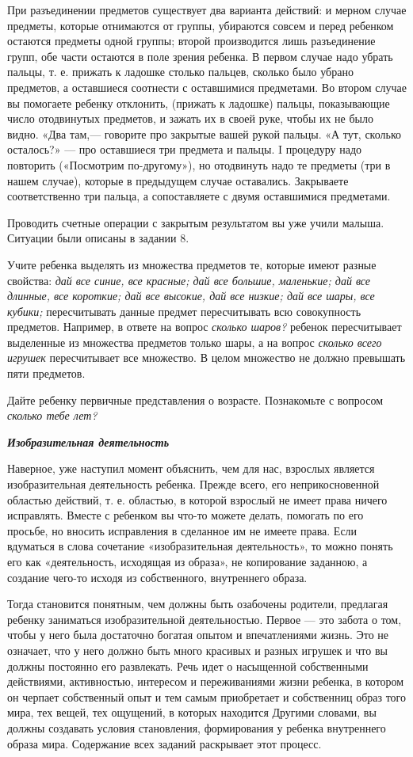 \documentclass[a5paper]{book}
\renewcommand{\emph}[1]{\textit{#1}}
\begin{document}
При разъединении предметов существует два варианта действий: и мерном
случае предметы, которые отнимаются от группы, убираются совсем и перед
ребенком остаются предметы одной группы; второй производится лишь
разъединение групп, обе части остаются в поле зрения ребенка. В первом
случае надо убрать пальцы, т. е. прижать к ладошке столько пальцев,
сколько было убрано предметов, а оставшиеся соотнести с оставшимися
предметами. Во втором случае вы помогаете ребенку отклонить, (прижать к
ладошке) пальцы, показывающие число отодвинутых предметов, и зажать их в
своей руке, чтобы их не было видно. «Два там,--- говорите про закрытые
вашей рукой пальцы. «А тут, сколько осталось?» --- про оставшиеся три
предмета и пальцы. I процедуру надо повторить («Посмотрим по-другому»),
но отодвинуть надо те предметы (три в нашем случае), которые в
предыдущем случае оставались. Закрываете соответственно три пальца, а
сопоставляете с двумя оставшимися предметами.

Проводить счетные операции с закрытым результатом вы уже учили малыша.
Ситуации были описаны в задании 8.

Учите ребенка выделять из множества предметов те, которые имеют разные
свойства: \emph{дай все синие, все красные; дай все большие, маленькие;
дай все длинные, все короткие; дай все высокие, дай все низкие; дай все
шары, все кубики;} пересчитывать данные предмет пересчитывать всю
совокупность предметов. Например, в ответе на вопрос \emph{сколько
шаров?} ребенок пересчитывает выделенные из множества предметов только
шары, а на вопрос \emph{сколько всего игрушек} пересчитывает все
множество. В целом множество не должно превышать пяти предметов.

Дайте ребенку первичные представления о возрасте. Познакомьте с вопросом
\emph{сколько тебе лет?}

\emph{\textbf{Изобразительная деятельность}}

Наверное, уже наступил момент объяснить, чем для нас, взрослых является
изобразительная деятельность ребенка. Прежде всего, его неприкосновенной
областью действий, т. е. областью, в которой взрослый не имеет права
ничего исправлять. Вместе с ребенком вы что-то можете делать, помогать
по его просьбе, но вносить исправления в сделанное им не имеете права.
Если вдуматься в слова сочетание «изобразительная деятельность», то
можно понять его как «деятельность, исходящая из образа», не копирование
заданною, а создание чего-то исходя из собственного, внутреннего образа.

Тогда становится понятным, чем должны быть озабочены родители, предлагая
ребенку заниматься изобразительной деятельностью. Первое --- это забота
о том, чтобы у него была достаточно богатая опытом и впечатлениями
жизнь. Это не означает, что у него должно быть много красивых и разных
игрушек и что вы должны постоянно его развлекать. Речь идет о насыщенной
собственными действиями, активностью, интересом и переживаниями жизни
ребенка, в котором он черпает собственный опыт и тем самым приобретает и
собственниц образ того мира, тех вещей, тех ощущений, в которых
находится Другими словами, вы должны создавать условия становления,
формирования у ребенка внутреннего образа мира. Содержание всех заданий
раскрывает этот процесс.
\end{document}
